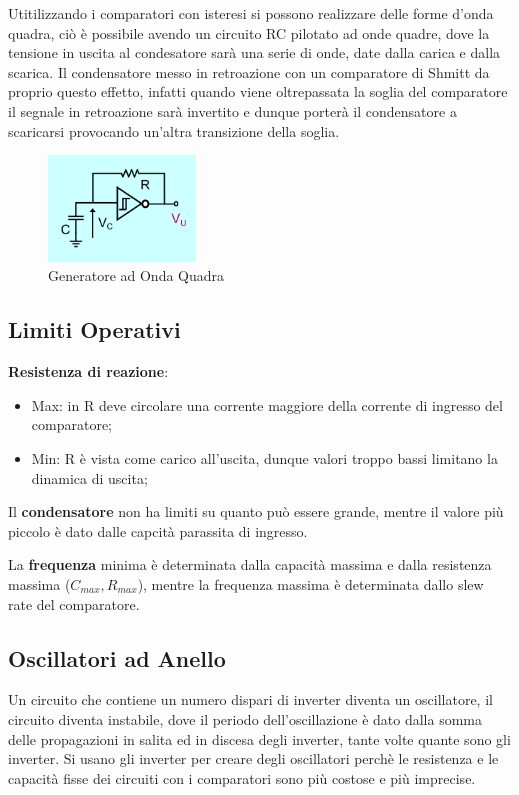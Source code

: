 \documentclass[12pt]{article}
\begin{document}
Utitilizzando i comparatori con isteresi si possono realizzare delle forme d'onda quadra, ci\`o \`e possibile avendo un circuito RC pilotato ad onde quadre, dove la tensione in uscita al condesatore sar\`a una serie di onde, date dalla carica e dalla scarica. Il condensatore messo in retroazione con un comparatore di Shmitt da proprio questo effetto, infatti quando viene oltrepassata la soglia del comparatore il segnale in retroazione sar\`a invertito e dunque porter\`a il condensatore a scaricarsi provocando un'altra transizione della soglia.
\begin{figure}[H]
    \centering
    \includegraphics[width=0.35\textwidth]{generatore-onda-quadra.png}
    \caption{Generatore ad Onda Quadra}
    \label{fig:generatore-onda-quadra}
\end{figure}


\subsection{Limiti Operativi}
\textbf{Resistenza di reazione}:
\begin{itemize}
    \item Max: in R deve circolare una corrente maggiore della corrente di ingresso del comparatore;
    \item Min: R \`e vista come carico all'uscita, dunque valori troppo bassi limitano la dinamica di uscita;
\end{itemize}

Il \textbf{condensatore} non ha limiti su quanto pu\`o essere grande, mentre il valore pi\`u piccolo \`e dato dalle capcit\`a parassita di ingresso.

La \textbf{frequenza} minima \`e determinata dalla capacit\`a massima e dalla resistenza massima ($C _{max}, R _{max}$), mentre la frequenza massima \`e determinata dallo slew rate del comparatore.

\subsection{Oscillatori ad Anello}
Un circuito che contiene un numero dispari di inverter diventa un oscillatore, il circuito diventa instabile, dove il periodo dell'oscillazione \`e dato dalla somma delle propagazioni in salita ed in discesa degli inverter, tante volte quante sono gli inverter. Si usano gli inverter per creare degli oscillatori perch\`e le resistenza e le capacit\`a fisse dei circuiti con i comparatori sono pi\`u costose e pi\`u imprecise.
\end{document}
